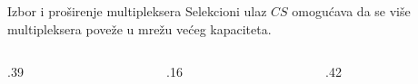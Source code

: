 \begin{frame}[label=03-s015]{Izbor i proširenje multipleksera}
\setlength{\parskip}{0pt}
Selekcioni ulaz \(CS\) omogućava da se više multipleksera poveže u mrežu većeg kapaciteta.
\par\vspace{.5mm}
\begingroup
\def\DEoznsize{9}\def\DEoblik{.6}\def\DEvisina{.64cm}\def\DEdekmod{1}\def\DEcs{1}\def\DEprimer{0}\def\DEjedinica{.75cm}
\begin{columns}[c,onlytextwidth]
\begin{column}{.39\textwidth}\centering

\end{column}
\begin{column}{.16\textwidth}\centering
\par
{}
\end{column}
\begin{column}{.42\textwidth}\centering

\end{column}
\end{columns}
\endgroup
\end{frame}
